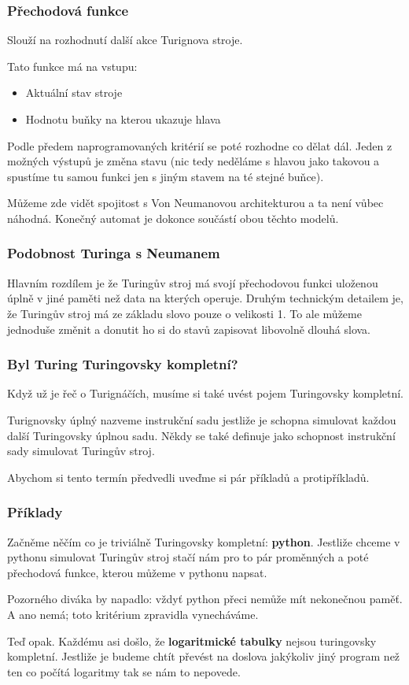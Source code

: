 \documentclass{beamer}
\begin{document}
\begin{frame}
 \frametitle{Přechodová funkce}
 Slouží na rozhodnutí další akce Turignova stroje.

 Tato funkce má na vstupu:
 \begin{itemize}
  \item Aktuální stav stroje
  \item Hodnotu buňky na kterou ukazuje hlava
 \end{itemize}
 Podle předem naprogramovaných kritérií se poté rozhodne co dělat dál. Jeden z
 možných výstupů je změna stavu (nic tedy neděláme s hlavou jako takovou a
 spustíme tu samou funkci jen s jiným stavem na té stejné buňce).

 Můžeme zde vidět spojitost s Von Neumanovou architekturou a ta není vůbec
 náhodná. Konečný automat je dokonce součástí obou těchto modelů.
\end{frame}

\begin{frame}
 \frametitle{Podobnost Turinga s Neumanem}
 Hlavním rozdílem je že Turingův stroj má svojí přechodovou funkci uloženou
 úplně v jiné paměti než data na kterých operuje. 
 \vfill
 Druhým technickým detailem je, že Turingův stroj má ze základu slovo pouze o
 velikosti 1. To ale můžeme jednoduše změnit a donutit ho si do stavů zapisovat
 libovolně dlouhá slova.
\end{frame}

\begin{frame}
\frametitle{Byl Turing Turingovsky kompletní?}
Když už je řeč o Turignáčích, musíme si také uvést pojem Turingovsky kompletní.
\begin{block}{Turignovsky úplný}
nazveme instrukční sadu jestliže je schopna simulovat každou další Turingovsky
úplnou sadu. Někdy se také definuje jako schopnost instrukční sady simulovat
Turingův stroj. 
\end{block}
Abychom si tento termín předvedli uveďme si pár příkladů a protipříkladů.
\end{frame}

\begin{frame}
 \frametitle{Příklady}
 Začněme něčím co je triviálně Turingovsky kompletní: \textbf{python}. Jestliže chceme
 v pythonu simulovat Turingův stroj stačí nám pro to pár proměnných a poté
 přechodová funkce, kterou můžeme v pythonu napsat.

 Pozorného diváka by napadlo: vždyť python přeci nemůže mít nekonečnou paměť. A
 ano nemá; toto kritérium zpravidla vynecháváme.

 \vfill
 Teď opak. Každému asi došlo, že \textbf{logaritmické tabulky} nejsou turingovsky
 kompletní. Jestliže je budeme chtít převést na doslova jakýkoliv jiný program
 než ten co počítá logaritmy tak se nám to nepovede.
 
\end{frame}
\end{document}
